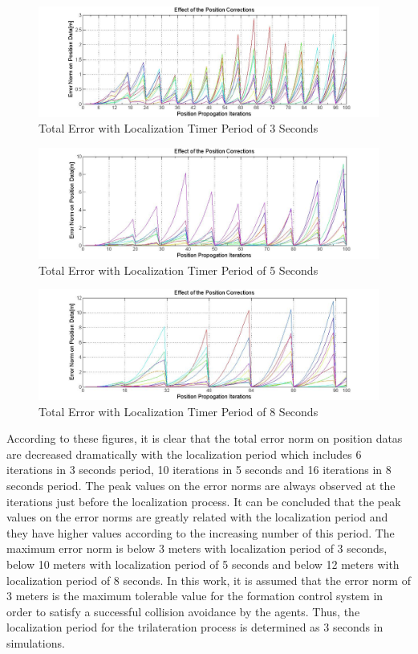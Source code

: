\begin{figure}[H]
\caption{Total Error with Localization Timer Period of 3 Seconds} \label{3second_period}
\centerline{\includegraphics[scale = 0.4]{Error-0,5Prop-3Update}}
\end{figure} 
		
\begin{figure}[H]
\caption{Total Error with Localization Timer Period of 5 Seconds} \label{5second_period}
\centerline{\includegraphics[scale = 0.4]{Error-0,5Prop-5Update}}
\end{figure} 

\begin{figure}[H]
\caption{Total Error with Localization Timer Period of 8 Seconds} \label{8second_period}
\centerline{\includegraphics[scale = 0.4]{Error-0,5Prop-8Update}}
\end{figure} 		
		
According to these figures, it is clear that the total error norm on position datas are decreased dramatically with the localization period which includes 6 iterations in 3 seconds period, 10 iterations in 5 seconds and 16 iterations in 8 seconds period. The peak values on the error norms are always observed at the iterations just before the localization process. It can be concluded that the peak values on the error norms are greatly related with the localization period and they have higher values according to the increasing number of this period. The maximum error norm is below 3 meters with localization period of 3 seconds, below 10 meters with localization period of 5 seconds and below 12 meters with localization period of 8 seconds. In this work, it is assumed that the error norm of 3 meters is the maximum tolerable value for the formation control system in order to satisfy a successful collision avoidance by the agents. Thus, the localization period for the trilateration process is determined as 3 seconds in simulations. 

